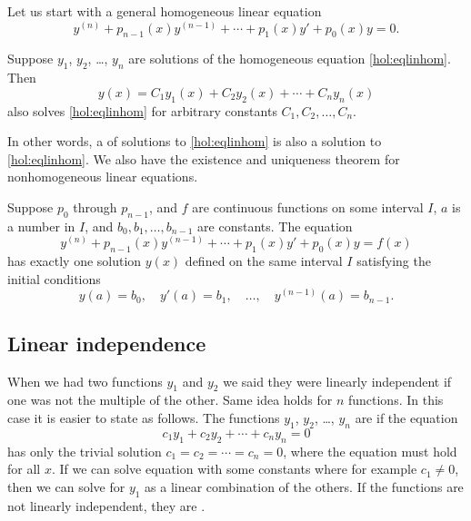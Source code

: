 Let us start with a general homogeneous linear equation
\begin{equation} \label{hol:eqlinhom}
y^{(n)} + p_{n-1}(x)y^{(n-1)} + \cdots + p_1(x) y' + p_0(x) y = 0 .
\end{equation}

\begin{theorem}[Superposition]
Suppose $y_1$, $y_2$, \ldots, $y_n$ are solutions of the
homogeneous equation \eqref{hol:eqlinhom}.  Then 
\begin{equation*}
y(x) = C_1 y_1(x) + C_2 y_2(x) + \cdots + C_n y_n(x) 
\end{equation*}
also solves \eqref{hol:eqlinhom}
for arbitrary constants $C_1, C_2, \ldots, C_n$.
\end{theorem}

In other words, a \emph{} of solutions
to \eqref{hol:eqlinhom}
is also a solution to \eqref{hol:eqlinhom}.
We also have the existence and uniqueness theorem for nonhomogeneous linear
equations.

\begin{theorem}
Suppose $p_0$ through $p_{n-1}$, and $f$ are continuous functions
on some interval $I$,
$a$ is a number in $I$,
and $b_0, b_1, \ldots, b_{n-1}$ are constants.
The equation
\begin{equation*} %
y^{(n)} + p_{n-1}(x)y^{(n-1)} + \cdots + p_1(x) y' + p_0(x) y = f(x) 
\end{equation*}
has exactly one solution $y(x)$ defined on the same interval $I$
satisfying the initial conditions
\begin{equation*}
y(a) = b_0, \quad y'(a) = b_1, \quad \ldots, \quad y^{(n-1)}(a) = b_{n-1} .
\end{equation*}
\end{theorem}

\subsection{Linear independence}

When we had two functions $y_1$ and $y_2$ we said they were linearly
independent if one was not the multiple of the other.  Same idea holds for
$n$ functions.  In this case it is easier to state as follows. The functions
$y_1$, $y_2$, \ldots, $y_n$ are \emph{} if
the equation
\begin{equation*}
c_1 y_1 + c_2 y_2 + \cdots + c_n y_n = 0 
\end{equation*}
has only the trivial solution $c_1 = c_2 = \cdots = c_n = 0$, where the
equation must hold for all $x$.  If we can
solve equation with some constants where for example $c_1 \not= 0$, then we
can solve for $y_1$ as a linear combination of the others.  If the functions
are not
linearly independent, they are \emph{}.

